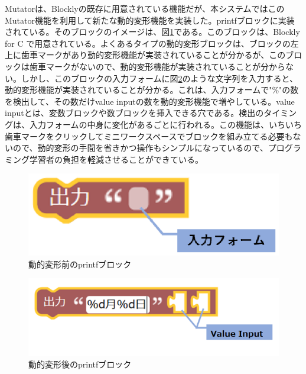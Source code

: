 \documentclass{risepaper}
\begin{document}
Mutatorは、Blocklyの既存に用意されている機能だが、本システムではこのMutator機能を利用して新たな動的変形機能を実装した。printfブロックに実装されている。そのブロックのイメージは、図\ref{fig:output}である。このブロックは、Blockly for C で用意されている。よくあるタイプの動的変形ブロックは、ブロックの左上に歯車マークがあり動的変形機能が実装されていることが分かるが、このブロックは歯車マークがないので、動的変形機能が実装されていることが分からない。しかし、このブロックの入力フォームに図\ref{fig:output2}のような文字列を入力すると、動的変形機能が実装されていることが分かる。これは、入力フォームで"\%"の数を検出して、その数だけvalue inputの数を動的変形機能で増やしている。value inputとは、変数ブロックや数ブロックを挿入できる穴である。検出のタイミングは、入力フォームの中身に変化があるごとに行われる。この機能は、いちいち歯車マークをクリックしてミニワークスペースでブロックを組み立てる必要もないので、動的変形の手間を省きかつ操作もシンプルになっているので、プログラミング学習者の負担を軽減させることができている。

\begin{figure}[h]
\begin{center}
\includegraphics[scale=0.5]{img/output.eps}
\caption{動的変形前のprintfブロック}%
\label{fig:output}
\end{center}%
\end{figure}%

\begin{figure}[h]
\begin{center}
\includegraphics[scale=0.5]{img/output2.png}
\caption{動的変形後のprintfブロック}%
\label{fig:output2}
\end{center}%
\end{figure}%
\end{document}
